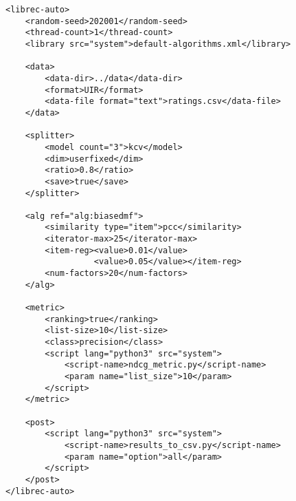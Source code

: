 \small{
\begin{verbatim}
<librec-auto>
    <random-seed>202001</random-seed>
    <thread-count>1</thread-count>
    <library src="system">default-algorithms.xml</library>
	
	<data>
        <data-dir>../data</data-dir>
        <format>UIR</format>
        <data-file format="text">ratings.csv</data-file>
	</data>
	
	<splitter>
        <model count="3">kcv</model>
        <dim>userfixed</dim>
        <ratio>0.8</ratio>
        <save>true</save>
	</splitter>
	
	<alg ref="alg:biasedmf">
        <similarity type="item">pcc</similarity>
        <iterator-max>25</iterator-max>
        <item-reg><value>0.01</value>
                  <value>0.05</value></item-reg>
        <num-factors>20</num-factors>
	</alg>

	<metric>
        <ranking>true</ranking>
        <list-size>10</list-size>
        <class>precision</class>
        <script lang="python3" src="system">
            <script-name>ndcg_metric.py</script-name>
            <param name="list_size">10</param>
        </script>
	</metric>
	
	<post>
        <script lang="python3" src="system">
            <script-name>results_to_csv.py</script-name>
            <param name="option">all</param>
        </script> 
	</post>
</librec-auto>
\end{verbatim}}
